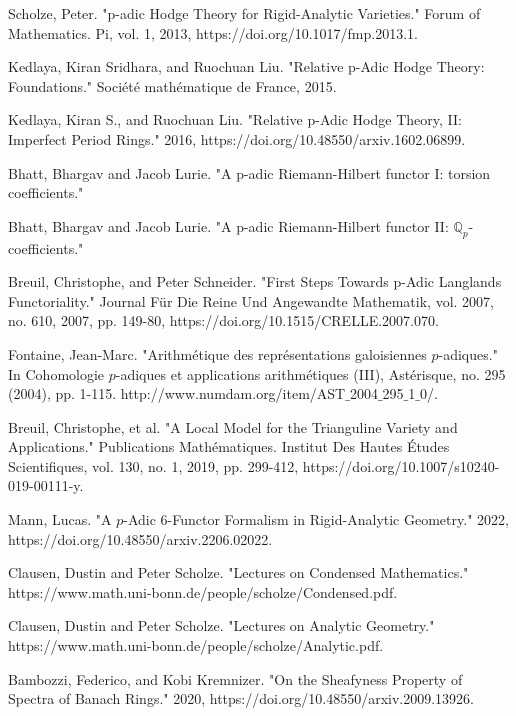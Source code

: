 \documentclass[12pt]{book}
\theoremstyle{definition}
\begin{document}
\newpage

\begin{thebibliography}{10}

 Scholze, Peter. "p-adic Hodge Theory for Rigid-Analytic Varieties." Forum of Mathematics. Pi, vol. 1, 2013, https://doi.org/10.1017/fmp.2013.1.

 Kedlaya, Kiran Sridhara, and Ruochuan Liu. "Relative p-Adic Hodge Theory: Foundations." Soci\'et\'e math\'ematique de France, 2015.

 Kedlaya, Kiran S., and Ruochuan Liu. "Relative p-Adic Hodge Theory, II: Imperfect Period Rings." 2016, https://doi.org/10.48550/arxiv.1602.06899.

 Bhatt, Bhargav and Jacob Lurie. "A p-adic Riemann-Hilbert functor I: torsion coefficients."

 Bhatt, Bhargav and Jacob Lurie. "A p-adic Riemann-Hilbert functor II: $\mathbb{Q}_p$-coefficients."

 Breuil, Christophe, and Peter Schneider. "First Steps Towards p-Adic Langlands Functoriality." Journal F\"ur Die Reine Und Angewandte Mathematik, vol. 2007, no. 610, 2007, pp. 149-80, https://doi.org/10.1515/CRELLE.2007.070.

 Fontaine, Jean-Marc. "Arithm\'etique des repr\'esentations galoisiennes $p$-adiques." In Cohomologie $p$-adiques et applications arithm\'etiques (III), Ast\'erisque, no. 295 (2004), pp. 1-115. http://www.numdam.org/item/AST$\_$2004$\_$295$\_$1$\_$0/.

 Breuil, Christophe, et al. "A Local Model for the Trianguline Variety and Applications." Publications Math\'ematiques. Institut Des Hautes \'Etudes Scientifiques, vol. 130, no. 1, 2019, pp. 299-412, https://doi.org/10.1007/s10240-019-00111-y.

  Mann, Lucas. "A $p$-Adic 6-Functor Formalism in Rigid-Analytic Geometry." 2022, https://doi.org/10.48550/arxiv.2206.02022.

 Clausen, Dustin and Peter Scholze. "Lectures on Condensed Mathematics." https://www.math.uni-bonn.de/people/scholze/Condensed.pdf. 

 Clausen, Dustin and Peter Scholze. "Lectures on Analytic Geometry." https://www.math.uni-bonn.de/people/scholze/Analytic.pdf.
 
 Bambozzi, Federico, and Kobi Kremnizer. "On the Sheafyness Property of Spectra of Banach Rings." 2020, https://doi.org/10.48550/arxiv.2009.13926.


\end{thebibliography}
\end{document}
